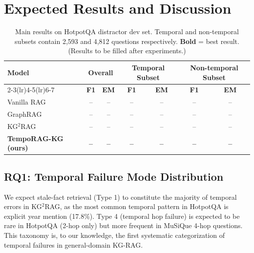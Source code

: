 \documentclass[11pt]{article}
\begin{document}
\section{Expected Results and Discussion}

\begin{table}[t]
  \centering
  \small
  \begin{tabular}{lcccccc}
    \toprule
    \multirow{2}{*}{\textbf{Model}} &
    \multicolumn{2}{c}{\textbf{Overall}} &
    \multicolumn{2}{c}{\textbf{Temporal Subset}} &
    \multicolumn{2}{c}{\textbf{Non-temporal Subset}} \\
    \cmidrule(lr){2-3}\cmidrule(lr){4-5}\cmidrule(lr){6-7}
    & \textbf{F1} & \textbf{EM} & \textbf{F1} & \textbf{EM} & \textbf{F1} & \textbf{EM} \\
    \midrule
    Vanilla RAG         & -- & -- & -- & -- & -- & -- \\
    GraphRAG            & -- & -- & -- & -- & -- & -- \\
    KG$^2$RAG           & -- & -- & -- & -- & -- & -- \\
    \midrule
    \textbf{TempoRAG-KG (ours)} & \textbf{--} & \textbf{--} & \textbf{--} & \textbf{--} & \textbf{--} & \textbf{--} \\
    \bottomrule
  \end{tabular}
  \caption{Main results on HotpotQA distractor dev set. Temporal and
  non-temporal subsets contain 2,593 and 4,812 questions respectively.
  \textbf{Bold} = best result. (Results to be filled after experiments.)}
  \label{tab:main_results}
\end{table}

\subsection{RQ1: Temporal Failure Mode Distribution}

We expect stale-fact retrieval (Type 1) to constitute the majority of
temporal errors in KG$^2$RAG, as the most common temporal pattern in
HotpotQA is explicit year mention (17.8\%). Type 4 (temporal hop failure) is
expected to be rare in HotpotQA (2-hop only) but more frequent in
MuSiQue 4-hop questions. This taxonomy is, to our knowledge, the first
systematic categorization of temporal failures in general-domain KG-RAG.
\end{document}
